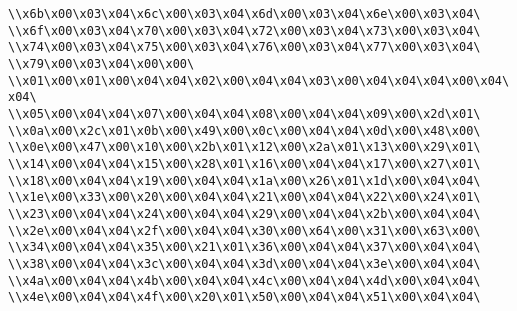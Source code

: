 \verb|\\x6b\x00\x03\x04\x6c\x00\x03\x04\x6d\x00\x03\x04\x6e\x00\x03\x04\|\newline
\verb|\\x6f\x00\x03\x04\x70\x00\x03\x04\x72\x00\x03\x04\x73\x00\x03\x04\|\newline
\verb|\\x74\x00\x03\x04\x75\x00\x03\x04\x76\x00\x03\x04\x77\x00\x03\x04\|\newline
\verb|\\x79\x00\x03\x04\x00\x00\|\newline
\verb|\\x01\x00\x01\x00\x04\x04\x02\x00\x04\x04\x03\x00\x04\x04\x04\x00\x04\x04\|\newline
\verb|\\x05\x00\x04\x04\x07\x00\x04\x04\x08\x00\x04\x04\x09\x00\x2d\x01\|\newline
\verb|\\x0a\x00\x2c\x01\x0b\x00\x49\x00\x0c\x00\x04\x04\x0d\x00\x48\x00\|\newline
\verb|\\x0e\x00\x47\x00\x10\x00\x2b\x01\x12\x00\x2a\x01\x13\x00\x29\x01\|\newline
\verb|\\x14\x00\x04\x04\x15\x00\x28\x01\x16\x00\x04\x04\x17\x00\x27\x01\|\newline
\verb|\\x18\x00\x04\x04\x19\x00\x04\x04\x1a\x00\x26\x01\x1d\x00\x04\x04\|\newline
\verb|\\x1e\x00\x33\x00\x20\x00\x04\x04\x21\x00\x04\x04\x22\x00\x24\x01\|\newline
\verb|\\x23\x00\x04\x04\x24\x00\x04\x04\x29\x00\x04\x04\x2b\x00\x04\x04\|\newline
\verb|\\x2e\x00\x04\x04\x2f\x00\x04\x04\x30\x00\x64\x00\x31\x00\x63\x00\|\newline
\verb|\\x34\x00\x04\x04\x35\x00\x21\x01\x36\x00\x04\x04\x37\x00\x04\x04\|\newline
\verb|\\x38\x00\x04\x04\x3c\x00\x04\x04\x3d\x00\x04\x04\x3e\x00\x04\x04\|\newline
\verb|\\x4a\x00\x04\x04\x4b\x00\x04\x04\x4c\x00\x04\x04\x4d\x00\x04\x04\|\newline
\verb|\\x4e\x00\x04\x04\x4f\x00\x20\x01\x50\x00\x04\x04\x51\x00\x04\x04\|\newline
